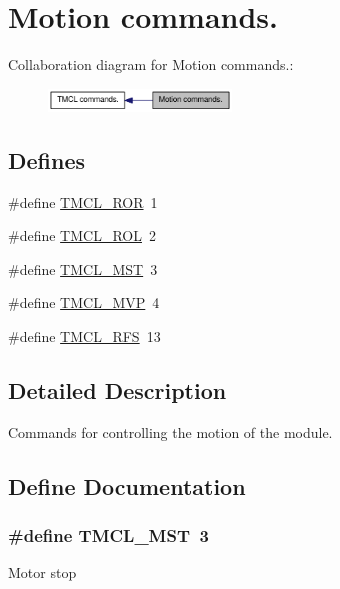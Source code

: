 \hypertarget{group__MotionComm}{
\section{Motion commands.}
\label{group__MotionComm}
}


Collaboration diagram for Motion commands.:\nopagebreak
\begin{figure}[H]
\begin{center}
\leavevmode
\includegraphics[width=138pt]{group__MotionComm}
\end{center}
\end{figure}
\subsection*{Defines}
\begin{DoxyCompactItemize}
\item 
\#define \hyperlink{group__MotionComm_gae60969d45c586023c9bd2db9498cc508}{TMCL\_\-ROR}~1
\item 
\#define \hyperlink{group__MotionComm_ga90f30df41b6fa29a3e94c909e655af94}{TMCL\_\-ROL}~2
\item 
\#define \hyperlink{group__MotionComm_ga94462741a6a5efcf6b175294cb9b6ecf}{TMCL\_\-MST}~3
\item 
\#define \hyperlink{group__MotionComm_ga109d51fee8df715b9e18b6c49b785757}{TMCL\_\-MVP}~4
\item 
\#define \hyperlink{group__MotionComm_ga316ddf99f164783c8488c48ce9346c21}{TMCL\_\-RFS}~13
\end{DoxyCompactItemize}


\subsection{Detailed Description}
Commands for controlling the motion of the module. 

\subsection{Define Documentation}
\hypertarget{group__MotionComm_ga94462741a6a5efcf6b175294cb9b6ecf}{
\subsubsection[{TMCL\_\-MST}]{\setlength{\rightskip}{0pt plus 5cm}\#define TMCL\_\-MST~3}}
\label{group__MotionComm_ga94462741a6a5efcf6b175294cb9b6ecf}
Motor stop 

